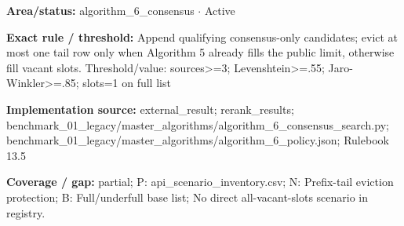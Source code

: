 \begin{tcolorbox}[enhanced,breakable,colback=white,colframe=Muted!45,boxrule=0.45pt,arc=1.5pt,left=6pt,right=6pt,top=5pt,bottom=5pt,title={\texttt{A6-EXTERNAL-SLOT-06}},title after break={\texttt{A6-EXTERNAL-SLOT-06}\ (continued)},fonttitle=\headingfont\bfseries\color{Navy},coltitle=Navy]
\textbf{Area/status:} algorithm\_\allowbreak{}6\_\allowbreak{}consensus $\boldsymbol{\cdot}$ Active\par
\smallskip
\textbf{Exact rule / threshold:} Append qualifying consensus-only candidates; evict at most one tail row only when Algorithm 5 already fills the public limit, otherwise fill vacant slots. Threshold/\allowbreak{}value: sources>=3; Levenshtein>=.55; Jaro-Winkler>=.85; slots=1 on full list\par
\smallskip
\textbf{Implementation source:} external\_\allowbreak{}result; rerank\_\allowbreak{}results; benchmark\_\allowbreak{}01\_\allowbreak{}legacy/\allowbreak{}master\_\allowbreak{}algorithms/\allowbreak{}algorithm\_\allowbreak{}6\_\allowbreak{}consensus\_\allowbreak{}search.py; benchmark\_\allowbreak{}01\_\allowbreak{}legacy/\allowbreak{}master\_\allowbreak{}algorithms/\allowbreak{}algorithm\_\allowbreak{}6\_\allowbreak{}policy.json; Rulebook 13.5\par
\smallskip
\textbf{Coverage / gap:} partial; P: api\_\allowbreak{}scenario\_\allowbreak{}inventory.csv; N: Prefix-tail eviction protection; B: Full/\allowbreak{}underfull base list; No direct all-vacant-slots scenario in registry.
\end{tcolorbox}
\medskip
